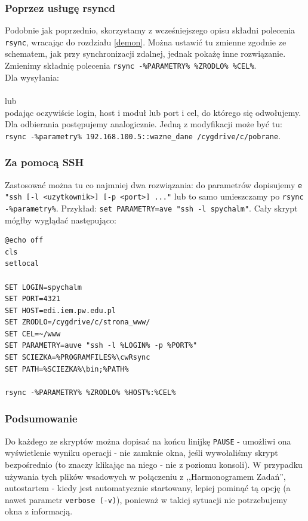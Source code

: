 \subsubsection{Poprzez usługę rsyncd}
Podobnie jak poprzednio, skorzystamy z wcześniejszego opisu składni polecenia \verb|rsync|, wracając do rozdziału \ref{demon}. Można ustawić tu zmienne zgodnie ze schematem, jak przy synchronizacji zdalnej, jednak pokażę inne rozwiązanie. Zmienimy składnię polecenia \verb|rsync -%PARAMETRY% %ZRODLO% %CEL%|. \\
Dla wysyłania:\\ \\lub\\  podając oczywiście login, host i moduł lub port i cel, do którego się odwołujemy.\\
Dla odbierania postępujemy analogicznie. Jedną z modyfikacji może być tu: \verb|rsync -%parametry% 192.168.100.5::wazne_dane /cygdrive/c/pobrane|.

\subsubsection{Za pomocą SSH}
Zastosować można tu co najmniej dwa rozwiązania: do parametrów dopisujemy \verb|e "ssh [-l <uzytkownik>] [-p <port>] ..."| lub to samo umieszczamy po \verb|rsync -%parametry%|. Przykład: \verb|set PARAMETRY=ave "ssh -l spychalm"|. Cały skrypt mógłby wyglądać następująco:
\begin{verbatim}
@echo off
cls
setlocal

SET LOGIN=spychalm
SET PORT=4321
SET HOST=edi.iem.pw.edu.pl
SET ZRODLO=/cygdrive/c/strona_www/
SET CEL=~/www
SET PARAMETRY=auve "ssh -l %LOGIN% -p %PORT%"
SET SCIEZKA=%PROGRAMFILES%\cwRsync
SET PATH=%SCIEZKA%\bin;%PATH%

rsync -%PARAMETRY% %ZRODLO% %HOST%:%CEL%
\end{verbatim}

\subsubsection{Podsumowanie}
Do każdego ze skryptów można dopisać na końcu linijkę \verb|PAUSE| - umożliwi ona wyświetlenie wyniku operacji - nie zamknie okna, jeśli wywołaliśmy skrypt bezpośrednio (to znaczy klikając na niego - nie z poziomu konsoli). W przypadku używania tych plików wsadowych w połączeniu z ,,Harmonogramem Zadań'', autostartem - kiedy jest automatycznie startowany, lepiej pominąć tą opcję (a nawet parametr \verb|verbose (-v)|), ponieważ w takiej sytuacji nie potrzebujemy okna z informacją. 

